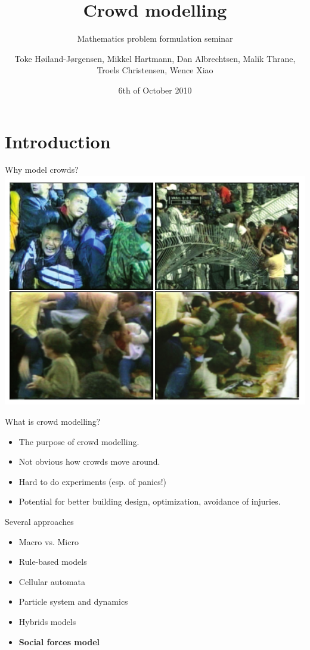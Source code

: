 \documentclass{beamer}
\title{Crowd modelling}
\subtitle
{Mathematics problem formulation seminar} %
\author{Toke Høiland-Jørgensen, Mikkel Hartmann, Dan Albrechtsen, Malik 
Thrane, Troels Christensen, Wence Xiao}
\date{6th of October 2010}
\begin{document}
\begin{frame}
  \titlepage
\end{frame}


\section{Introduction}
\begin{frame}{Why model crowds?}
    \includegraphics[width=\textwidth]{page-pictures-crop.pdf}
\end{frame}


\begin{frame}{What is crowd modelling?}
    \begin{itemize}
    	\item The purpose of crowd modelling.
        \item Not obvious how crowds move around.
        \item Hard to do experiments (esp. of panics!)
        \item Potential for better building design, optimization, avoidance of 
            injuries.
    \end{itemize}
\end{frame}

\begin{frame}{Several approaches}
    \begin{itemize}
    	\item Macro vs. Micro
        \item Rule-based models
        \item Cellular automata
        \item Particle system and dynamics
        \item Hybrids models
        \item \textbf{Social forces model}
    \end{itemize}
\end{frame}
\end{document}
